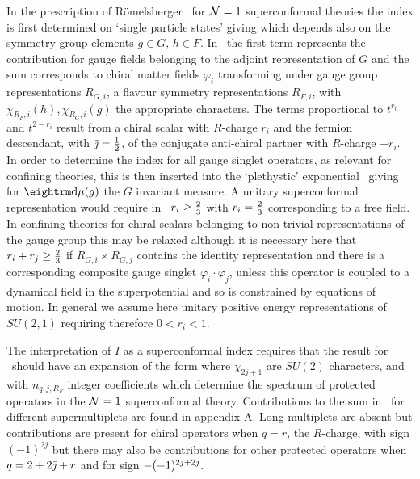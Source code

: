 In the prescription of R\"omelsberger \romel\ for ${\cal N}=1$ superconformal theories
the index is first determined on `single particle states' giving
\eqn{}
which depends also on the symmetry group elements $g\in G, \, h \in F$.
In \ione\ the first term represents the contribution for gauge fields belonging
to the adjoint representation of $G$ and the sum corresponds to chiral matter fields 
$\varphi_i$ transforming under  gauge group representations $R_{G,i}$,
a flavour symmetry representations $R_{F,i}$, with  $\chi_{R_F,i}(h),\chi_{R_G,i}(g)$ 
the appropriate characters. The terms proportional to $t^{r_i}$ and $t^{2-r_i}$
result from a chiral scalar with $R$-charge $r_i$ and the fermion
descendant, with ${\bar \jmath} = {1\over 2}$, of the conjugate anti-chiral partner 
with $R$-charge $-r_i$. In order to 
determine the index for all gauge singlet operators, as relevant for confining
theories, this is then inserted into the `plethystic' exponential \bofengt\ giving
\eqn{}
for $\d \mu(g)$ the $G$ invariant measure.
A unitary superconformal representation would require in \ione\ $r_i\ge {2\over 3}$ with
$r_i = {2\over 3}$ corresponding to a free field. In confining theories for chiral scalars 
belonging to non trivial representations of the gauge group this may be relaxed although
it is necessary here that $r_i+r_j \ge {2\over 3}$ if $R_{G,i} \times R_{G,j}$
contains the identity representation and there is a corresponding composite gauge singlet
$\varphi_i \cdot \varphi_j$, unless this operator is coupled to a dynamical field in the 
superpotential and so is constrained by equations of motion.
In general we assume here unitary positive energy
representations of $SU(2,1)$ requiring therefore $0<r_i<1$.

The interpretation of $I$ as a superconformal index requires that the result for 
\itwo\ should have an expansion of the form
\eqn{}
where $\chi_{2j+1}$ are $SU(2)$ characters, and with  $n_{q,j,R_F}$ integer 
coefficients which determine the spectrum of protected operators in the ${\cal N}=1$ 
superconformal theory. Contributions to the sum in \expI\ for different
supermultiplets are found in appendix A. Long multiplets are absent
but contributions are present for chiral operators when $q=r$, the $R$-charge,
with sign $(-1)^{2j}$ but there may also be contributions for other protected 
operators when $q = 2 +2{\bar \jmath}+r$ and for sign $-(-1)^{2j+2{\bar \jmath}}$.

